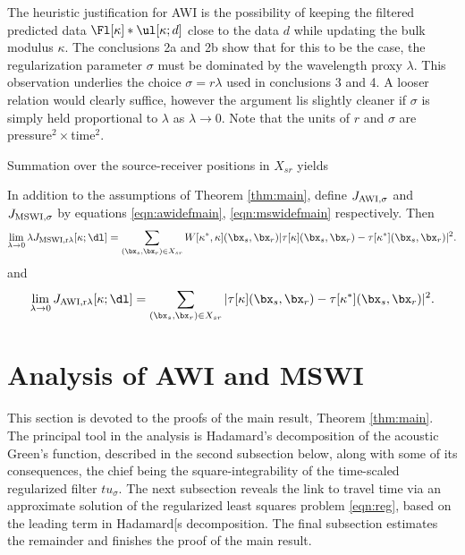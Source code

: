  The heuristic justification for AWI is the possibility of keeping the
filtered predicted data $\Fl[\kappa]*\ul[\kappa;d]$ close to the data
$d$ while updating the bulk modulus $\kappa$. The conclusions 2a and
2b show that for this to be the case, the regularization parameter $\sigma$
must be dominated by the wavelength proxy $\lambda$. This observation underlies the choice
$\sigma = r\lambda$ used in conclusions 3 and 4. A looser relation
would clearly suffice, however the argument lis slightly cleaner if
$\sigma$ is simply held proportional to $\lambda$ as $\lambda
\rightarrow 0$. Note that the units of $r$ and $\sigma$ are pressure$^2 \times$time$^2$.

Summation over the source-receiver positions in $X_{sr}$ yields
\begin{cor}
  \label{thm:cor1}
  In addition to the assumptions of Theorem \ref{thm:main}, define $J_{\rm
    AWI,\sigma}$ and $J_{\rm MSWI,\sigma}$ by equations
  \ref{eqn:awidefmain}, \ref{eqn:mswidefmain} respectively. Then
\begin{equation}
\label{eqn:cor1mswi}   
\lim_{\lambda \rightarrow 0} \lambda J_{\rm MSWI,r\lambda}[\kappa;\dl]
= \sum_{(\bx_s,\bx_r) \in X_{sr}} W[\kappa^*,\kappa](\bx_s,\bx_r) |\tau[\kappa](\bx_s,\bx_r) - \tau[\kappa^*](\bx_s,\bx_r)|^2.
\end{equation}
and
\begin{equation}
\label{eqn:cor1awi}   
\lim_{\lambda \rightarrow 0} J_{\rm AWI,r\lambda}[\kappa;\dl]
= \sum_{(\bx_s,\bx_r) \in X_{sr}}  |\tau[\kappa](\bx_s,\bx_r) - \tau[\kappa^*](\bx_s,\bx_r)|^2.
\end{equation}
\end{cor}

\section{Analysis of AWI and MSWI}
This section is devoted to the proofs of the main result, Theorem
\ref{thm:main}.  The principal tool in the analysis is Hadamard's
decomposition of the acoustic Green's function, described in the
second
subsection below, along with some of its consequences, the chief being the
square-integrability of the time-scaled regularized filter
$tu_{\sigma}$. The next subsection reveals the link to travel time via
an approximate solution of the regularized least squares problem
\ref{eqn:reg}, based on the leading term in Hadamard[s decomposition.
The final subsection estimates the remainder and finishes the proof of
the main result.

